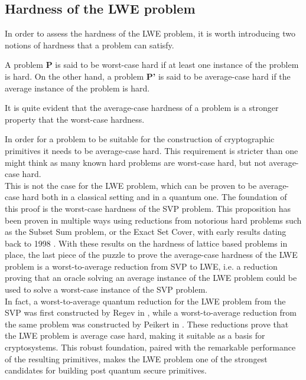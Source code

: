\subsection{Hardness of the LWE problem}
In order to assess the hardness of the LWE problem, it is worth introducing two notions of hardness that a problem can satisfy.

\begin{definition}
A problem \textbf{P} is said to be worst-case hard if at least one instance of the problem is hard.
On the other hand, a problem \textbf{P'} is said to be average-case hard if the average instance of the problem is hard.
\end{definition}
\begin{remark}
It is quite evident that the average-case hardness of a problem is a stronger property that the worst-case hardness.
\end{remark}
In order for a problem to be suitable for the construction of cryptographic primitives it needs to be average-case hard. This requirement is stricter than one might think as many known hard problems are worst-case hard, but not average-case hard.\\
This is not the case for the LWE problem, which can be proven to be average-case hard both in a classical setting and in a quantum one. The foundation of this proof is the worst-case hardness of the SVP problem. This proposition has been proven in multiple ways using reductions from notorious hard problems such as the Subset Sum problem, or the Exact Set Cover, with early results dating back to 1998 \cite{svp_hardness}. With these results on the hardness of lattice based problems in place, the last piece of the puzzle to prove the average-case hardness of the LWE problem is a worst-to-average reduction from SVP to LWE, i.e. a reduction proving that an oracle solving an average instance of the LWE problem could be used to solve a worst-case instance of the SVP problem.\\
In fact, a worst-to-average quantum reduction for the LWE problem from the SVP was first constructed by Regev in \cite{lwe_q_hardness}, while a worst-to-average reduction from the same problem was constructed by Peikert in \cite{lwe_c_hardness}. These reductions prove that the LWE problem is average case hard, making it suitable as a basis for cryptosystems. This robust foundation, paired with the remarkable performance of the resulting primitives, makes the LWE problem one of the strongest candidates for building post quantum secure primitives.